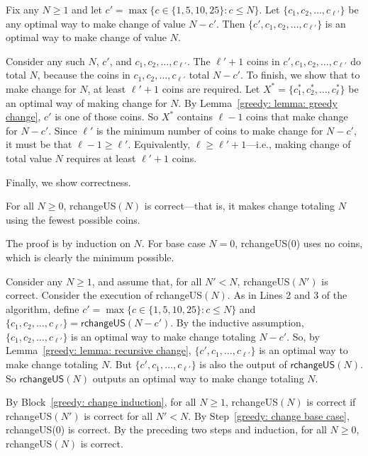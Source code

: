 \begin{lemma}\label{greedy: lemma: recursive change}
  Fix any $N\ge 1$ and let $c' = \max\big\{c \in \{1, 5, 10, 25\} : c \le N\big\}$.
  Let $\{c_1, c_2, \ldots, c_{\ell'}\}$ be any optimal way to make change of value $N-c'$.
  Then $\{c', c_1, c_2, \ldots, c_{\ell'}\}$ is an optimal way to make change of value $N$.
\end{lemma}
\begin{longFormProof}
  \step Consider any such $N$, $c'$, and $c_1, c_2, \ldots, c_{\ell'}$.
  \step The $\ell'+1$ coins in $c', c_1, c_2, \ldots, c_{\ell'}$ do total $N$,
  because the coins in $c_1, c_2,\ldots, c_{\ell'}$ total $N-c'$.
  \step To finish, we show that to make change for $N$, at least $\ell'+1$ coins are required.
  \step Let $X^*=\{c^*_1, c^*_2, \ldots, c^*_{\ell}\}$ be an optimal way of making change for $N$.
  \step By Lemma~\ref{greedy: lemma: greedy change}, $c'$ is one of those coins.
  \step So $X^*$ contains $\ell-1$ coins that make change for $N-c'$.
  \step Since $\ell'$ is the minimum number of coins to make change for $N-c'$, it must be that $\ell-1 \ge \ell'$.
  \step Equivalently, $\ell \ge \ell'+1$---i.e., making change of total value $N$ requires at least $\ell'+1$ coins.
\end{longFormProof}

Finally, we show correctness.  
\begin{lemma}  
  For all $N\ge 0$, \textsf{rchangeUS}$(N)$ is correct---that is, it
  makes change totaling $N$ using the fewest possible coins.
\end{lemma}
\begin{longFormProof}
  \step The proof is by induction on $N$.
  For base case $N=0$, \textsf{rchangeUS}(0) uses no coins, which is clearly the minimum possible.
  \begin{block}
    \step Consider any $N\ge 1$, and assume that, for all $N'<N$, \textsf{rchangeUS}$(N')$ is correct.
    \step Consider the execution of \textsf{rchangeUS}$(N)$.  As in Lines 2 and 3 of the algorithm,
    \step define $c' = \max\{c\in\{1,5,10,25\} : c \le N\}$ and $\{c_1, c_2, \ldots, c_{\ell'}\}= \textsf{rchangeUS}(N-c')$.
    \step By the inductive assumption, $\{c_1, c_2, \ldots, c_{\ell'}\}$ is an optimal way to make change totaling $N-c'$.
    \step So, by Lemma~\ref{greedy: lemma: recursive change}, $\{c',c_1,\ldots, c_{\ell'}\}$ is an optimal way to make change totaling $N$.
    \step But $\{c',c_1,\ldots, c_{\ell'}\}$ is also the output of $\textsf{rchangeUS}(N)$.
    \step So $\textsf{rchangeUS}(N)$ outputs an optimal way to make change totaling $N$.
  \end{block}
  \step By Block~\ref{greedy: change induction}, for all $N\ge 1$,
  \textsf{rchangeUS}$(N)$ is correct if \textsf{rchangeUS}$(N')$ is correct for all $N'< N$.
  \step By Step~\ref{greedy: change base case}, \textsf{rchangeUS}(0) is correct.
  \step By the preceding two steps and induction, for all $N\ge 0$, \textsf{rchangeUS}$(N)$ is correct.
\end{longFormProof}

